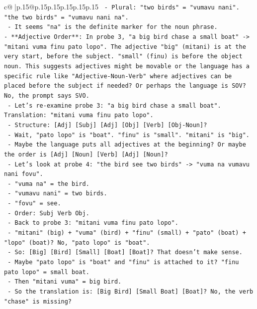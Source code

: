\documentclass{article}
\begin{document}
{\begin{supertabular}{c@{$\;$}|p{.15\linewidth}@{}p{.15\linewidth}p{.15\linewidth}p{.15\linewidth}p{.15\linewidth}p{.15\linewidth}}
{{{\texttt{  {-} Plural: "two birds" = "vumavu nani". "the two birds" = "vumavu nani na".} \\
\texttt{  {-} It seems "na" is the definite marker for the noun phrase.} \\
\texttt{{-} **Adjective Order**: In probe 3, "a big bird chase a small boat" {-}> "mitani vuma finu pato lopo". The adjective "big" (mitani) is at the very start, before the subject. "small" (finu) is before the object noun. This suggests adjectives might be movable or the language has a specific rule like "Adjective{-}Noun{-}Verb" where adjectives can be placed before the subject if needed? Or perhaps the language is SOV? No, the prompt says SVO.} \\
\texttt{  {-} Let's re{-}examine probe 3: "a big bird chase a small boat". Translation: "mitani vuma finu pato lopo".} \\
\texttt{  {-} Structure: {[}Adj{]} {[}Subj{]} {[}Adj{]} {[}Obj{]} {[}Verb{]} {[}Obj{-}Noun{]}?} \\
\texttt{  {-} Wait, "pato lopo" is "boat". "finu" is "small". "mitani" is "big".} \\
\texttt{  {-} Maybe the language puts all adjectives at the beginning? Or maybe the order is {[}Adj{]} {[}Noun{]} {[}Verb{]} {[}Adj{]} {[}Noun{]}?} \\
\texttt{  {-} Let's look at probe 4: "the bird see two birds" {-}> "vuma na vumavu nani fovu".} \\
\texttt{    {-} "vuma na" = the bird.} \\
\texttt{    {-} "vumavu nani" = two birds.} \\
\texttt{    {-} "fovu" = see.} \\
\texttt{    {-} Order: Subj Verb Obj.} \\
\texttt{  {-} Back to probe 3: "mitani vuma finu pato lopo".} \\
\texttt{    {-} "mitani" (big) + "vuma" (bird) + "finu" (small) + "pato" (boat) + "lopo" (boat)? No, "pato lopo" is "boat".} \\
\texttt{    {-} So: {[}Big{]} {[}Bird{]} {[}Small{]} {[}Boat{]} {[}Boat{]}? That doesn't make sense.} \\
\texttt{    {-} Maybe "pato lopo" is "boat" and "finu" is attached to it? "finu pato lopo" = small boat.} \\
\texttt{    {-} Then "mitani vuma" = big bird.} \\
\texttt{    {-} So the translation is: {[}Big Bird{]} {[}Small Boat{]} {[}Boat{]}? No, the verb "chase" is missing?} \\
}}}
\end{supertabular}}
\end{document}
